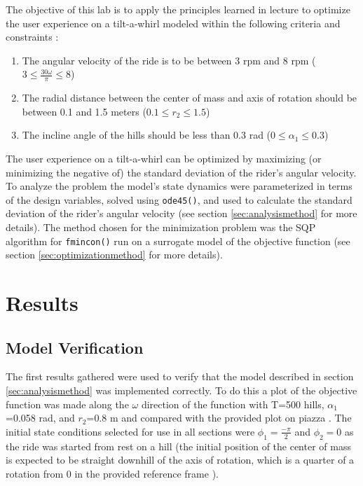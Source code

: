 \documentclass[11pt]{article}%
\begin{document}
The objective of this lab is to apply the principles learned in lecture to optimize the user experience on a tilt-a-whirl modeled within the following criteria and constraints \cite{lab3doc}:
\begin{enumerate}
	\item The angular velocity of the ride is to be between 3 rpm and 8 rpm ($3\leq\frac{30\omega}{\pi}\leq8$)
	\item The radial distance between the center of mass and axis of rotation should be between 0.1 and 1.5 meters ($0.1\leq r_{2}\leq1.5$)
	\item The incline angle of the hills should be less than 0.3 rad ($0\leq\alpha_{1}\leq0.3$)
\end{enumerate}
The user experience on a tilt-a-whirl can be optimized by maximizing (or minimizing the negative of) the standard deviation of the rider's angular velocity. To analyze the problem the model's state dynamics were parameterized in terms of the design variables, solved using \lstinline{ode45()}, and used to calculate the standard deviation of the rider's angular velocity (see section \ref{sec:analysismethod} for more details). The method chosen for the minimization problem was the SQP algorithm for \lstinline{fmincon()} run on a surrogate model of the objective function (see section \ref{sec:optimizationmethod} for more details).

\section{Results}
\label{sec:results}

\subsection{Model Verification}
\label{sec:verification}

The first results gathered were used to verify that the model described in section \ref{sec:analysismethod} was implemented correctly. To do this a plot of the objective function was made along the $\omega$ direction of the function with T=500 hills, $\alpha_{1}$=0.058 rad, and $r_{2}$=0.8 m and compared with the provided plot on piazza \cite{piazza}. The initial state conditions selected for use in all sections were $\phi_{1} = \frac{-\pi}{2}$ and $\phi_{2}=0$ as the ride was started from rest on a hill (the initial position of the center of mass is expected to be straight downhill of the axis of rotation, which is a quarter of a rotation from 0 in the provided reference  frame \cite{dynamics}).
	
\end{document}
